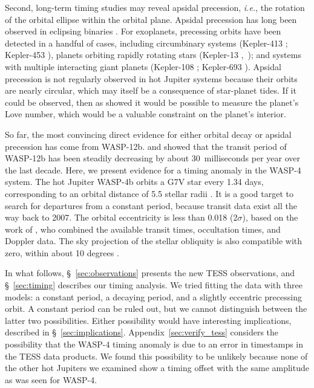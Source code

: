 \documentclass[12pt,twocolumn,tighten]{aastex62}
\begin{document}
Second, long-term timing studies may reveal apsidal precession, {\it
i.e.}, the rotation of the orbital ellipse within the orbital plane.
Apsidal precession has long been observed in eclipsing binaries
\citep[{\it e.g.},][]{
  schwarzschild_structure_1958,torres_accurate_2010,borkovits_eclipse_2015}.
For exoplanets, precessing orbits have been detected in a handful of
cases, including circumbinary systems (Kepler-413
\citealt{kostov_kepler-413b_2014}; Kepler-453
\citealt{welsh_kepler_2015}), planets orbiting rapidly rotating stars
(Kepler-13
\citealt{szabo_spin-orbit_2012,szabo_mapping_2014},~\citealt{masuda_spin-orbit_2015});
and systems with multiple interacting giant planets (Kepler-108
\citealt{mills_kepler-108_2017}; Kepler-693
\citealt{masuda_eccentric_2017}).  Apsidal precession is not regularly
observed in hot Jupiter systems because their orbits are nearly
circular, which may itself be a consequence of star-planet tides.  If
it could be observed, then as \citet{ragozzine_probing_2009} showed it
would be possible to measure the planet's Love number, which would be
a valuable constraint on the planet's interior.

So far, the most convincing direct evidence for either orbital decay
or apsidal precession has come from WASP-12b.
\citet{maciejewski_departure_2016} and \citet{patra_2017} showed that
the transit period of WASP-12b has been steadily decreasing by about
30~milliseconds per year over the last decade.  Here, we present
evidence for a timing anomaly in the WASP-4 system.  The hot Jupiter
WASP-4b orbits a G7V star every 1.34 days, corresponding to an orbital
distance of 5.5 stellar radii
\citep{wilson_wasp-4b_2008,huitson_gemini_2017}.  It is a good target
to search for departures from a constant period, because transit data
exist all the way back to 2007.  The orbital eccentricity is less than
0.018 (2$\sigma$), based on the work of \cite{knutson_friends_2014},
who combined the available transit times, occultation times, and
Doppler data.  The sky projection of the stellar obliquity
is also compatible with zero, within about 10 degrees
\citep{triaud_spin-orbit_2010,sanchis-ojeda_starspots_2011}.

In what follows, \S~\ref{sec:observations} presents the new TESS
observations, and \S~\ref{sec:timing} describes our timing analysis.
We tried fitting the data with three models: a constant period, a
decaying period, and a slightly eccentric precessing orbit.  A
constant period can be ruled out, but we cannot distinguish between
the latter two possibilities.  Either possibility would have
interesting implications, described in \S~\ref{sec:implications}.
Appendix~\ref{sec:verify_tess} considers the possibility that the
WASP-4 timing anomaly is due to an error in timestamps in the TESS
data products.  We found this possibility to be unlikely because none
of the other hot Jupiters we examined show a timing offset with the
same amplitude as was seen for WASP-4.
\end{document}
